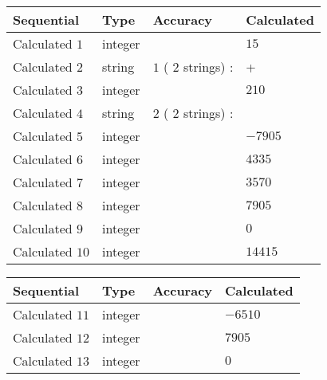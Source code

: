 \documentclass[12pt]{article}
\begin{document}
  
\noindent\begin{tabular}{|l|l|l|l|}
\hline
 Sequential & Type & Accuracy & Calculated \\ 
\hline
 
 
  Calculated $           1$ & integer &  & 
  $ 15 $ 
 \\  \hline  
 
 
  Calculated $           2$ & string & $           1 $ ( $          2 $ strings)
 : 
 & +
 \\  \hline  
 
 
  Calculated $           3$ & integer &  & 
  $ 210 $ 
 \\  \hline  
 
 
  Calculated $           4$ & string & $           2 $ ( $          2 $ strings)
 : 
 & 
 \\  \hline  
 
 
  Calculated $           5$ & integer &  & 
  $ -7905 $ 
 \\  \hline  
 
 
  Calculated $           6$ & integer &  & 
  $ 4335 $ 
 \\  \hline  
 
 
  Calculated $           7$ & integer &  & 
  $ 3570 $ 
 \\  \hline  
 
 
  Calculated $           8$ & integer &  & 
  $ 7905 $ 
 \\  \hline  
 
 
  Calculated $           9$ & integer &  & 
  $ 0 $ 
 \\  \hline  
 
 
  Calculated $          10$ & integer &  & 
  $ 14415 $ 
 \\  \hline  
 \end{tabular}
   
   
  
  
\noindent\begin{tabular}{|l|l|l|l|}
\hline
 Sequential & Type & Accuracy & Calculated \\ 
\hline
 
 
  Calculated $          11$ & integer &  & 
  $ -6510 $ 
 \\  \hline  
 
 
  Calculated $          12$ & integer &  & 
  $ 7905 $ 
 \\  \hline  
 
 
  Calculated $          13$ & integer &  & 
  $ 0 $ 
 \\  \hline  
 \end{tabular}
   
\end{document}
